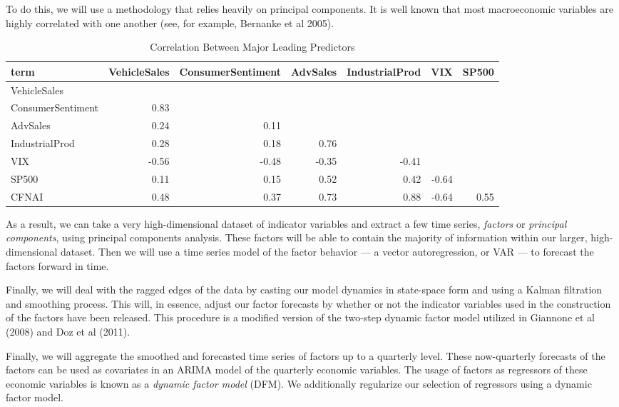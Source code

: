 \documentclass[11pt, letterpaper]{article}\usepackage[]{graphicx}\usepackage[]{color}
\begin{document}
To do this, we will use a methodology that relies heavily on principal components. It is well known that most macroeconomic variables are highly correlated with one another (see, for example, Bernanke et al 2005).
\begin{table}[H]
\centering
\begingroup\scriptsize
\begin{tabular}{lrrrrrr}
  \hline
term & VehicleSales & ConsumerSentiment & AdvSales & IndustrialProd & VIX & SP500 \\ 
  \hline
VehicleSales &  &  &  &  &  &  \\ 
  ConsumerSentiment & 0.83 &  &  &  &  &  \\ 
  AdvSales & 0.24 & 0.11 &  &  &  &  \\ 
  IndustrialProd & 0.28 & 0.18 & 0.76 &  &  &  \\ 
  VIX & -0.56 & -0.48 & -0.35 & -0.41 &  &  \\ 
  SP500 & 0.11 & 0.15 & 0.52 & 0.42 & -0.64 &  \\ 
  CFNAI & 0.48 & 0.37 & 0.73 & 0.88 & -0.64 & 0.55 \\ 
   \hline
\end{tabular}
\endgroup
\caption{Correlation Between Major Leading Predictors} 
\end{table}

As a result, we can take a very high-dimensional dataset of indicator variables and extract a few time series, \textit{factors} or \textit{principal components}, using principal components analysis. These factors will be able to contain the majority of information within our larger, high-dimensional dataset. Then we will use a time series model of the factor behavior --- a vector autoregression, or VAR --- to forecast the factors forward in time. 

Finally, we will deal with the ragged edges of the data by casting our model dynamics in state-space form and using a Kalman filtration and smoothing process. This will, in essence, adjust our factor forecasts by whether or not the indicator variables used in the construction of the factors have been released. This procedure is a modified version of the two-step dynamic factor model utilized in Giannone et al (2008) and Doz et al (2011).

Finally, we will aggregate the smoothed and forecasted time series of factors up to a quarterly level. These now-quarterly forecasts of the factors can be used as covariates in an ARIMA model of the quarterly economic variables. The usage of factors as regressors of these economic variables is known as a \textit{dynamic factor model} (DFM). We additionally regularize our selection of regressors using a dynamic factor model.
\end{document}
